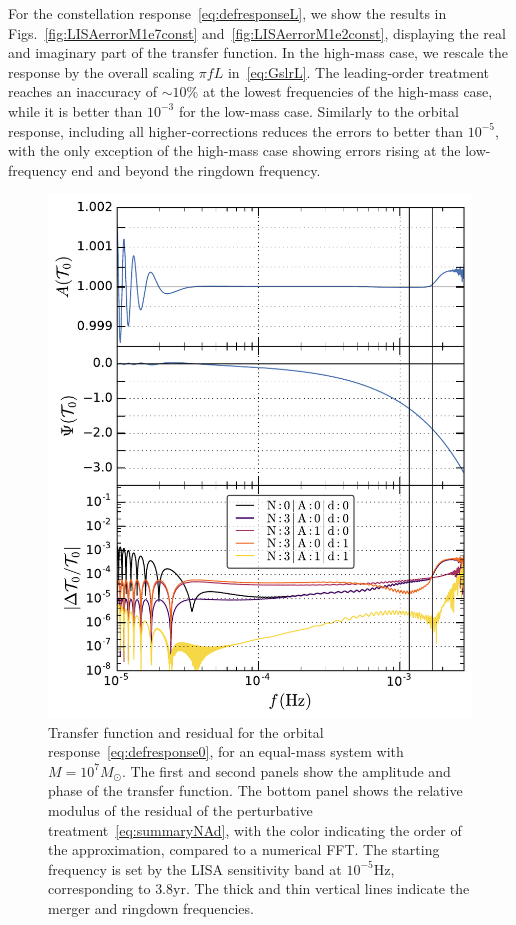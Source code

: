 \documentclass[aps,showpacs,twocolumn,
prd,superscriptaddress,nofootinbib]{revtex4-1}
\newcommand{\Msol}{M_{\odot}}
\begin{document}
For the constellation response~\eqref{eq:defresponseL}, we show the results in Figs.~\ref{fig:LISAerrorM1e7const} and~\ref{fig:LISAerrorM1e2const}, displaying the real and imaginary part of the transfer function. In the high-mass case, we rescale the response by the overall scaling $\pi f L$ in~\eqref{eq:GslrL}. The leading-order treatment reaches an inaccuracy of $\sim 10\%$ at the lowest frequencies of the high-mass case, while it is better than $10^{-3}$ for the low-mass case. Similarly to the orbital response, including all higher-corrections reduces the errors to better than $10^{-5}$, with the only exception of the high-mass case showing errors rising at the low-frequency end and beyond the ringdown frequency.

\begin{figure}
  \centering
  \includegraphics[width=.98\linewidth]{plots/LISAtransfererrorM1e7dO_py.pdf}
  \caption{Transfer function and residual for the orbital response~\eqref{eq:defresponse0}, for an equal-mass system with $M=10^{7} \Msol$. The first and second panels show the amplitude and phase of the transfer function. The bottom panel shows the relative modulus of the residual of the perturbative treatment~\eqref{eq:summaryNAd}, with the color indicating the order of the approximation, compared to a numerical FFT. The starting frequency is set by the LISA sensitivity band at $10^{-5}\mathrm{Hz}$, corresponding to $3.8\mathrm{yr}$. The thick and thin vertical lines indicate the merger and ringdown frequencies.}
  \label{fig:LISAerrorM1e7orb}
\end{figure}
\end{document}
